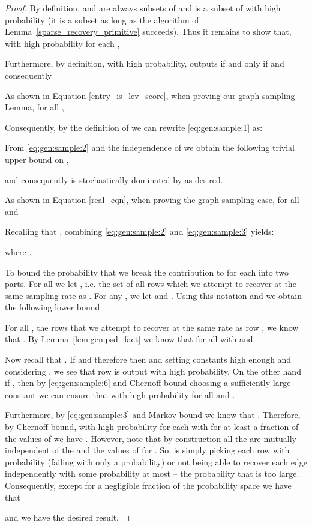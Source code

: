 \documentclass[11pt]{article}
\begin{document}
\begin{proof}
By definition,  and  are always subsets of  and  is a subset of  with high probability (it is a subset as long as the algorithm of Lemma~\ref{sparse_recovery_primitive} succeeds). Thus it remains to show that, with high probability for each  ,

    Furthermore, by definition, with high probability,  outputs  if and only if  and consequently

As shown in Equation \ref{entry_is_lev_score}, when proving our graph sampling Lemma, for all ,

Consequently, by the definition of  we can rewrite \eqref{eq:gen:sample:1} as:

From \eqref{eq:gen:sample:2} and the independence of  we obtain the following trivial upper bound on ,

and consequently  is stochastically dominated by  as desired.

As shown in Equation \ref{real_eqn}, when proving the graph sampling case, for all  and 

Recalling that , combining \eqref{eq:gen:sample:2} and \eqref{eq:gen:sample:3} yields:

where .

To bound the probability that  we break the contribution to  for each  into two parts. For all  we let , i.e. the set of all rows  which we attempt to recover at the same sampling rate as . For any , we let  and  . Using this notation and  we obtain the following lower bound

For all , the rows that we attempt to recover at the same rate as row , we know that . By Lemma~\ref{lem:gen:psd_fact} we know that for all  with  and 


Now recall that . If  and therefore  then  and setting constants high enough and considering , we see that row  is output with high probability. On the other hand if , then by \eqref{eq:gen:sample:6} and Chernoff bound choosing a sufficiently large constant we can ensure that with high probability  for all  and . 

Furthermore, by \eqref{eq:gen:sample:3} and Markov bound we know that . Therefore, by Chernoff bound, with high probability for each  with  for at least a  fraction of the values of  we have . However, note that by construction all the  are mutually independent of the  and the values of  for . So,  is simply picking each row  with probability  (failing with only a  probability) or not being able to recover each edge independently with some probability at most  -- the probability that  is too large. Consequently,  except for a negligible fraction of the probability space we have that

and we have the desired result.
\end{proof}
\end{document}

